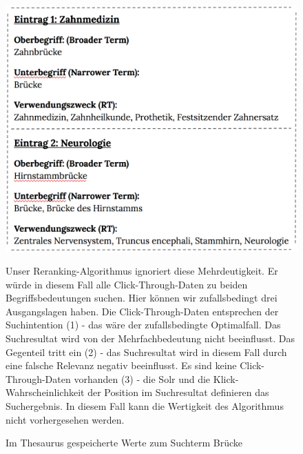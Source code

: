 \begin{figure}[H]
\centering
\begin{minipage}{0.45\linewidth}
        \centering
        \vspace{-2em}
		\caption[Im Thesaurus gespeicherte Werte zum Suchterm \glqq Brücke\grqq{}]{Im Thesaurus gespeicherte Werte zum Suchterm \glqq Brücke\grqq{}}
		\label{fig:ThesaurusBruecke}
		\includegraphics[width=\linewidth]{gfx/BeispielMehrdeutigkeit}
		\vspace{-3em}
    \end{minipage}
    \hfill
    \begin{minipage}{0.45\linewidth}
        Unser Reranking-Algorithmus ignoriert diese Mehrdeutigkeit. Er würde in diesem Fall alle Click-Through-Daten zu beiden Begriffsbedeutungen suchen. Hier können wir zufallsbedingt drei Ausgangslagen haben. Die Click-Through-Daten entsprechen der Suchintention (1) - das wäre der zufallsbedingte Optimalfall. Das Suchresultat wird von der Mehrfachbedeutung nicht beeinflusst. Das Gegenteil tritt ein (2) - das Suchresultat wird in diesem Fall durch eine falsche Relevanz negativ beeinflusst. Es sind keine Click-Through-Daten vorhanden (3) - die Solr und die Klick-Wahrscheinlichkeit der Position im Suchresultat definieren das Suchergebnis. In diesem Fall kann die Wertigkeit des Algorithmus nicht vorhergesehen werden.
    \end{minipage}
\end{figure}

